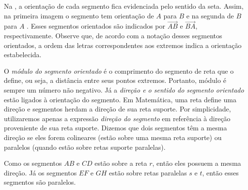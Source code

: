 Na , a orientação de cada segmento fica evidenciada pelo sentido da seta. Assim, na primeira imagem o segmento tem orientação de \(A\) para \(B\) e na segunda de \(B\) para \(A\) .  Esses segmentos orientados são indicados por \(\overrightarrow{AB}\) e \(\overrightarrow{BA}\), respectivamente.  Observe que, de acordo com a notação desses segmentos orientados, a ordem das letras correspondentes aos extremos indica a orientação estabelecida.

O \textit{módulo do segmento orientado} é o comprimento do segmento de reta que o define, ou seja, a distância entre seus pontos extremos. Portanto, módulo é sempre um número não negativo. Já a \textit{direção e o sentido do segmento orientado} estão ligados à orientação do segmento. Em Matemática, uma reta define uma direção e segmentos herdam a direção de sua reta suporte. Por simplicidade, utilizaremos apenas a expressão \textit{direção do segmento} em referência à direção proveniente de sua reta suporte. Dizemos que dois segmentos têm a mesma direção se eles forem colineares (estão sobre uma mesma reta suporte) ou paralelos (quando estão sobre retas suporte paralelas).
\begin{figure}[H]
\centering
{}
\caption{}
\label{fig-geometria-operacoesvetores-03}
\end{figure}

Como os segmentos \(AB\) e \(CD\) estão sobre a reta \(r\), então eles possuem a mesma direção. Já os segmentos \(EF\) e \(GH\) estão sobre retas paralelas \(s\) e \(t\), então esses segmentos são paralelos.

